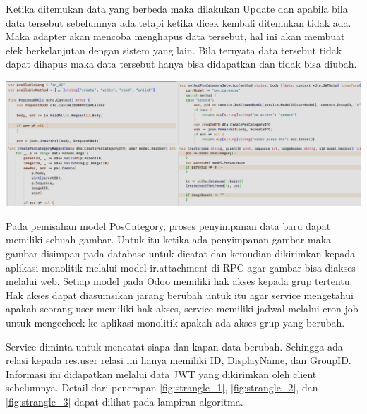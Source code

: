 Ketika ditemukan data yang berbeda maka dilakukan Update dan apabila bila data tersebut sebelumnya ada tetapi ketika dicek kembali ditemukan tidak ada. Maka adapter akan mencoba menghapus data tersebut, hal ini akan membuat efek berkelanjutan dengan sistem yang lain. Bila ternyata data tersebut tidak dapat dihapus maka data tersebut hanya bisa didapatkan dan tidak bisa diubah.

\begin{center}
	\includegraphics[width=14cm]{img/bab_4/strangle_3.png}
	\label{fig:strangle_3}
\end{center}

Pada pemisahan  model PosCategory, proses penyimpanan data baru dapat memiliki sebuah gambar. Untuk itu ketika ada penyimpanan gambar maka gambar disimpan pada database untuk dicatat dan kemudian dikirimkan kepada aplikasi monolitik melalui model ir.attachment di RPC agar gambar bisa diakses melalui web. Setiap model pada Odoo memiliki hak akses kepada grup tertentu. Hak akses dapat diasumsikan jarang berubah untuk itu agar service mengetahui apakah seorang user memiliki hak akses, service memiliki jadwal melalui cron job untuk mengecheck ke aplikasi monolitik apakah ada akses grup yang berubah.

Service diminta untuk mencatat siapa dan kapan data berubah. Sehingga ada relasi kepada res.user relasi ini hanya memiliki ID, DisplayName, dan GroupID. Informasi ini didapatkan melalui data JWT yang dikirimkan oleh client sebelumnya. Detail dari penerapan \ref{fig:strangle_1}, \ref{fig:strangle_2}, dan \ref{fig:strangle_3} dapat dilihat pada lampiran algoritma.
\\

